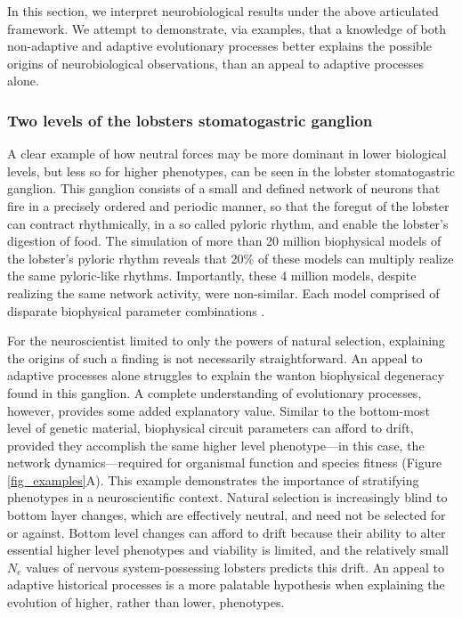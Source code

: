 \documentclass[twocolumn]{article}
\begin{document}
In this section, we interpret neurobiological results under the above articulated framework. We attempt to demonstrate, via examples, that a knowledge of both non-adaptive and adaptive evolutionary processes better explains the possible origins of neurobiological observations, than an appeal to adaptive processes alone. 

\subsubsection{Two levels of the lobsters stomatogastric ganglion}

A clear example of how neutral forces may be more dominant in lower biological levels, but less so for higher phenotypes, can be seen in the lobster stomatogastric ganglion. This ganglion consists of a small and defined network of neurons that fire in a precisely ordered and periodic manner, so that the foregut of the lobster can contract rhythmically, in a so called pyloric rhythm, and enable the lobster's digestion of food. The simulation of more than 20 million biophysical models of the lobster's pyloric rhythm reveals that 20\% of these models can multiply realize the same pyloric-like rhythms. Importantly, these 4 million models, despite realizing the same network activity, were non-similar. Each model comprised of disparate biophysical parameter combinations \cite{prinz_marder_2004}.

For the neuroscientist limited to only the powers of natural selection, explaining the origins of such a finding is not necessarily straightforward. An appeal to adaptive processes alone struggles to explain the wanton biophysical degeneracy found in this ganglion. A complete understanding of evolutionary processes, however, provides some added explanatory value. Similar to the bottom-most level of genetic material, biophysical circuit parameters can afford to drift, provided they accomplish the same higher level phenotype---in this case, the network dynamics---required for organismal function and species fitness (Figure \ref{fig_examples}A). This example demonstrates the importance of stratifying phenotypes in a neuroscientific context. Natural selection is increasingly blind to bottom layer changes, which are effectively neutral, and need not be selected for or against. Bottom level changes can afford to drift because their ability to alter essential higher level phenotypes and viability is limited, and the relatively small $N_e$ values of nervous system-possessing lobsters predicts this drift. An appeal to adaptive historical processes is a more palatable hypothesis when explaining the evolution of higher, rather than lower, phenotypes.
\end{document}
